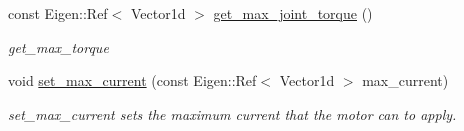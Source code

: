 \begin{DoxyCompactItemize}
const Eigen\+::\+Ref$<$ Vector1d $>$ \hyperlink{classblmc__robots_1_1SingleMotor_af83ef444bdd1eebdac1df6d8035d2b75}{get\+\_\+max\+\_\+joint\+\_\+torque} ()
\begin{DoxyCompactList}\small\item\em get\+\_\+max\+\_\+torque \end{DoxyCompactList}\item 
void \hyperlink{classblmc__robots_1_1SingleMotor_af2add59e3d08949c658568b6d161b5ba}{set\+\_\+max\+\_\+current} (const Eigen\+::\+Ref$<$ Vector1d $>$ max\+\_\+current)
\begin{DoxyCompactList}\small\item\em set\+\_\+max\+\_\+current sets the maximum current that the motor can to apply. \end{DoxyCompactList}\end{DoxyCompactItemize}
